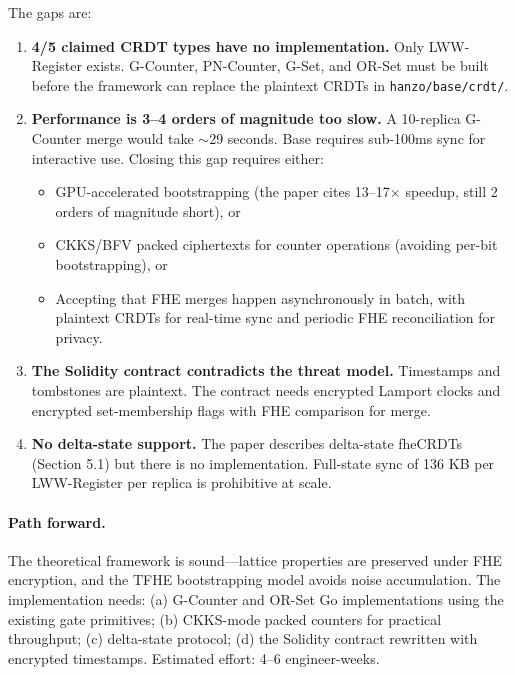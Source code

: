 \documentclass{fhe-shared/luxfhe}
\begin{document}
The gaps are:

\begin{enumerate}[noitemsep]
\item \textbf{4/5 claimed CRDT types have no implementation.}
      Only LWW-Register exists.  G-Counter, PN-Counter, G-Set, and OR-Set
      must be built before the framework can replace the plaintext CRDTs
      in \texttt{hanzo/base/crdt/}.

\item \textbf{Performance is 3--4 orders of magnitude too slow.}
      A 10-replica G-Counter merge would take $\sim$29 seconds.
      Base requires sub-100ms sync for interactive use.
      Closing this gap requires either:
      \begin{itemize}[noitemsep]
        \item GPU-accelerated bootstrapping (the paper cites 13--17$\times$
              speedup, still 2 orders of magnitude short), or
        \item CKKS/BFV packed ciphertexts for counter operations
              (avoiding per-bit bootstrapping), or
        \item Accepting that FHE merges happen asynchronously in batch,
              with plaintext CRDTs for real-time sync and periodic
              FHE reconciliation for privacy.
      \end{itemize}

\item \textbf{The Solidity contract contradicts the threat model.}
      Timestamps and tombstones are plaintext.  The contract needs
      encrypted Lamport clocks and encrypted set-membership flags
      with FHE comparison for merge.

\item \textbf{No delta-state support.}  The paper describes delta-state
      fheCRDTs (Section 5.1) but there is no implementation.  Full-state
      sync of 136 KB per LWW-Register per replica is prohibitive at scale.
\end{enumerate}

\paragraph{Path forward.}
The theoretical framework is sound---lattice properties are preserved
under FHE encryption, and the TFHE bootstrapping model avoids noise
accumulation.  The implementation needs:
(a) G-Counter and OR-Set Go implementations using the existing gate
primitives;
(b) CKKS-mode packed counters for practical throughput;
(c) delta-state protocol;
(d) the Solidity contract rewritten with encrypted timestamps.
Estimated effort: 4--6 engineer-weeks.
\end{document}

